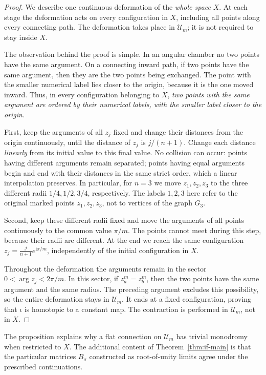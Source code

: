 \documentclass[12pt]{amsart}
\theoremstyle{definition}
\numberwithin{equation}{section}
\theoremstyle{definition}
\let\mc\mathcal
\let\si\sigma
\begin{document}
\begin{proof}
We describe one continuous deformation of the \emph{whole space}
$X$. At each stage the deformation acts on every configuration in
$X$, including all points along every connecting path. The
deformation takes place in $\mc U_m$; it is not required to stay
inside $X$.

The observation behind the proof is simple. In an angular
chamber no two points have the same argument. On a connecting
inward path, if two points have the same argument, then they are
the two points being exchanged. The point with the smaller
numerical label lies closer to the origin, because it is the one
moved inward. Thus, in every configuration belonging to $X$,
\emph{two points with the same argument are ordered by their
numerical labels, with the smaller label closer to the origin}.

First, keep the arguments of all $z_j$ fixed and change their
distances from the origin continuously, until the distance of
$z_j$ is $j/(n+1)$. Change each distance \emph{linearly} from its
initial value to this final value. No collision can occur:
points having different arguments remain separated; points
having equal arguments begin and end with their distances in the
same strict order, which a linear interpolation preserves.
In particular, for $n=3$ we move $z_1,z_2,z_3$ to the three
different radii $1/4,1/2,3/4$, respectively. The labels
$1,2,3$ here refer to the original marked points
$z_1,z_2,z_3$, not to vertices of the graph $G_3$.

Second, keep these different radii fixed and move the arguments
of all points continuously to the common value $\pi/m$.
The points cannot meet during this step, because their radii
are different. At the end we reach the same configuration
$z_j=\frac{j}{n+1}e^{\mathrm{i}\pi/m}$, independently of the
initial configuration in $X$.

Throughout the deformation the arguments remain in the sector
$0<\arg z_j<2\pi/m$. In this sector, if $z_a^m=z_b^m$, then
the two points have the same argument and the same radius.
The preceding argument excludes this possibility, so the
entire deformation stays in $\mc U_m$. It ends at a fixed
configuration, proving that $\iota$ is homotopic to a constant
map. The contraction is performed in $\mc U_m$, not in $X$.
\end{proof}

The proposition explains why a flat connection on $\mc U_m$
has trivial monodromy when restricted to $X$. The additional
content of Theorem~\ref{thm:if-main} is that the particular
matrices $B_\si$ constructed as root-of-unity limits agree under
the prescribed continuations.
\end{document}
